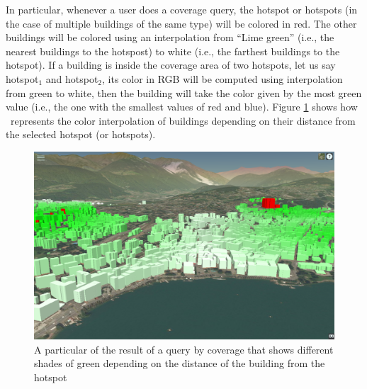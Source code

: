 In particular, whenever a user does a coverage query, the hotspot or hotspots (in the case of multiple buildings of the same type) will be colored in red. The other buildings will be colored using an interpolation from ``Lime green'' (i.e., the nearest buildings to the hotspost) to white (i.e., the farthest buildings to the hotspot). 
If a building is inside the coverage area of two hotspots, let us say hotspot$_{1}$ and hotspot$_{2}$, its color in RGB will be computed using interpolation from green to white, then the building will take the color given by the most green value (i.e., the one with the smallest values of red and blue). Figure \ref{fig:queryParticular} shows how \applicationName\ represents the color interpolation of buildings depending on their distance from the selected hotspot (or hotspots).

\begin{figure} [H]
\centering
\includegraphics[width=.8\textwidth]{chapter4/images/queryParticular}
\caption{A particular of the result of a query by coverage that shows different shades of green depending on the distance of the building from the hotspot}
\label{fig:queryParticular}
\end{figure} 

